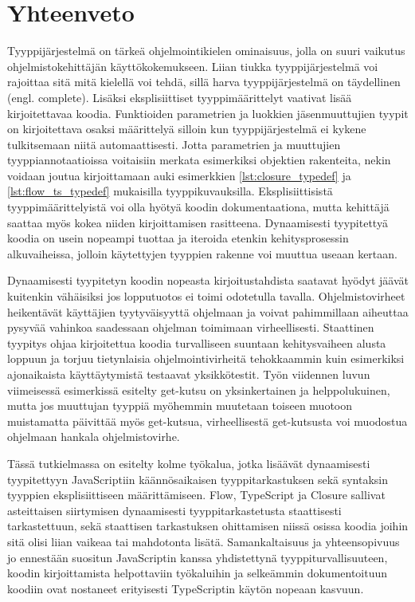 \chapter{Yhteenveto}

Tyyppijärjestelmä on tärkeä ohjelmointikielen ominaisuus, jolla on suuri
vaikutus ohjelmistokehittäjän käyttökokemukseen.
Liian tiukka tyyppijärjestelmä voi rajoittaa sitä mitä kielellä voi tehdä,
sillä harva tyyppijärjestelmä on täydellinen (engl. complete).
Lisäksi eksplisiittiset tyyppimäärittelyt vaativat lisää kirjoitettavaa koodia.
Funktioiden parametrien ja luokkien jäsenmuuttujien tyypit on kirjoitettava
osaksi määrittelyä silloin kun tyyppijärjestelmä ei kykene tulkitsemaan
niitä automaattisesti. Jotta parametrien ja muuttujien tyyppiannotaatioissa
voitaisiin merkata esimerkiksi objektien rakenteita, nekin voidaan
joutua kirjoittamaan auki esimerkkien \ref{lst:closure_typedef} ja
\ref{lst:flow_ts_typedef} mukaisilla tyyppikuvauksilla.
Eksplisiittisistä tyyppimäärittelyistä voi olla hyötyä
koodin dokumentaationa, mutta kehittäjä saattaa myös kokea niiden
kirjoittamisen rasitteena. Dynaamisesti tyypitettyä koodia on usein
nopeampi tuottaa ja iteroida etenkin kehitysprosessin alkuvaiheissa, jolloin
käytettyjen tyyppien rakenne voi muuttua useaan kertaan. 

Dynaamisesti tyypitetyn koodin nopeasta kirjoitustahdista saatavat hyödyt jäävät kuitenkin
vähäisiksi jos lopputuotos ei toimi odotetulla tavalla. Ohjelmistovirheet heikentävät
käyttäjien tyytyväisyyttä ohjelmaan ja voivat pahimmillaan aiheuttaa
pysyvää vahinkoa saadessaan ohjelman toimimaan virheellisesti.
Staattinen tyypitys ohjaa kirjoitettua koodia turvalliseen suuntaan kehitysvaiheen alusta
loppuun ja torjuu tietynlaisia ohjelmointivirheitä tehokkaammin kuin
esimerkiksi ajonaikaista käyttäytymistä testaavat yksikkötestit.
Työn viidennen luvun viimeisessä esimerkissä esitelty get-kutsu on yksinkertainen
ja helppolukuinen, mutta jos muuttujan  tyyppiä myöhemmin
muutetaan toiseen muotoon muistamatta päivittää myös get-kutsua, virheellisestä
get-kutsusta voi muodostua ohjelmaan hankala ohjelmistovirhe.

Tässä tutkielmassa on esitelty kolme työkalua, jotka lisäävät dynaamisesti
tyypitettyyn JavaScriptiin käännösaikaisen tyyppitarkastuksen sekä syntaksin
tyyppien eksplisiittiseen määrittämiseen. Flow, TypeScript ja Closure
sallivat asteittaisen siirtymisen dynaamisesti tyyppitarkastetusta staattisesti
tarkastettuun, sekä staattisen tarkastuksen ohittamisen niissä osissa koodia
joihin sitä olisi liian vaikeaa tai mahdotonta lisätä.
Samankaltaisuus ja yhteensopivuus jo ennestään suositun JavaScriptin kanssa
yhdistettynä tyyppiturvallisuuteen, koodin kirjoittamista helpottaviin
työkaluihin ja selkeämmin dokumentoituun koodiin ovat nostaneet erityisesti
TypeScriptin käytön nopeaan kasvuun.
